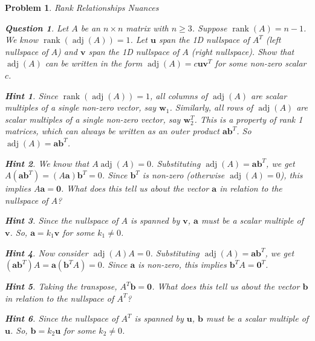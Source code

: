 \documentclass[12pt]{article}
\newtheorem{problem}{Problem}[section]
\newtheorem{question}{Question}[problem]
\theoremstyle{definition}
\newtheorem{hint}{Hint}[question]
\newcommand{\adj}{\operatorname{adj}}
\newcommand{\rank}{\operatorname{rank}}
\newcommand{\vect}[1]{\mathbf{#1}} %
\begin{document}
\begin{problem}{Rank Relationships Nuances}
    \begin{question}
        Let $A$ be an $n \times n$ matrix with $n \ge 3$. Suppose $\rank(A) = n-1$. We know $\rank(\adj(A))=1$. Let $\vect{u}$ span the 1D nullspace of $A^T$ (left nullspace of $A$) and $\vect{v}$ span the 1D nullspace of $A$ (right nullspace). Show that $\adj(A)$ can be written in the form $\adj(A) = c \vect{u} \vect{v}^T$ for some non-zero scalar $c$.
    \end{question}
    \begin{hint}
        Since $\rank(\adj(A))=1$, all columns of $\adj(A)$ are scalar multiples of a single non-zero vector, say $\vect{w}_1$. Similarly, all rows of $\adj(A)$ are scalar multiples of a single non-zero vector, say $\vect{w}_2^T$. This is a property of rank 1 matrices, which can always be written as an outer product $\vect{a} \vect{b}^T$. So $\adj(A) = \vect{a} \vect{b}^T$.
    \end{hint}
    \begin{hint}
        We know that $A \adj(A) = 0$. Substituting $\adj(A) = \vect{a} \vect{b}^T$, we get $A (\vect{a} \vect{b}^T) = (A\vect{a})\vect{b}^T = 0$. Since $\vect{b}^T$ is non-zero (otherwise $\adj(A)=0$), this implies $A\vect{a} = \vect{0}$. What does this tell us about the vector $\vect{a}$ in relation to the nullspace of $A$?
    \end{hint}
    \begin{hint}
        Since the nullspace of $A$ is spanned by $\vect{v}$, $\vect{a}$ must be a scalar multiple of $\vect{v}$. So, $\vect{a} = k_1 \vect{v}$ for some $k_1 \neq 0$.
    \end{hint}
    \begin{hint}
        Now consider $\adj(A) A = 0$. Substituting $\adj(A) = \vect{a} \vect{b}^T$, we get $(\vect{a} \vect{b}^T) A = \vect{a} (\vect{b}^T A) = 0$. Since $\vect{a}$ is non-zero, this implies $\vect{b}^T A = \vect{0}^T$.
    \end{hint}
    \begin{hint}
        Taking the transpose, $A^T \vect{b} = \vect{0}$. What does this tell us about the vector $\vect{b}$ in relation to the nullspace of $A^T$?
    \end{hint}
    \begin{hint}
        Since the nullspace of $A^T$ is spanned by $\vect{u}$, $\vect{b}$ must be a scalar multiple of $\vect{u}$. So, $\vect{b} = k_2 \vect{u}$ for some $k_2 \neq 0$.
    \end{hint}

\end{problem}
\end{document}
